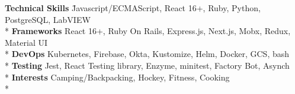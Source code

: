 
\newenvironment{nospacetabbing}{
    \begin{tabbing}
}{\end{tabbing}\vspace{-1.2em}}


\begin{cventries}

\begin{nospacetabbing}

  \textbf{Technical Skills}  \= Javascript/ECMAScript, React 16+, Ruby, Python, PostgreSQL, LabVIEW\\*
  \textbf{Frameworks} \> React 16+, Ruby On Rails, Express.js, Next.js, Mobx, Redux, Material UI\\*
  \textbf{DevOps} \> Kubernetes, Firebase, Okta, Kustomize, Helm, Docker, GCS, bash\\*
  \textbf{Testing} \> Jest, React Testing library, Enzyme, minitest, Factory Bot, Asynch\\*
  \textbf{Interests} \> Camping/Backpacking, Hockey, Fitness, Cooking\\*
  \end{nospacetabbing}
\end{cventries}
